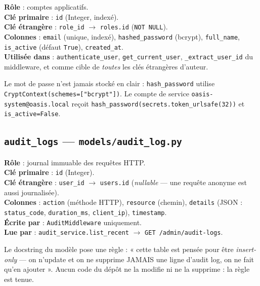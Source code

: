 \documentclass[11pt,a4paper]{report}
\newcommand{\file}[1]{\texttt{\small #1}}
\newcommand{\fn}[1]{\texttt{\small\textcolor{oasisviolet}{#1}}}
\newcommand{\cls}[1]{\texttt{\small\textcolor{oasisblue}{#1}}}
\newcommand{\tbl}[1]{\texttt{\small\textcolor{oasisamber}{#1}}}
\newcommand{\route}[1]{\texttt{\small\textcolor{oasisgreen}{#1}}}
\newcommand{\arrowto}{\ensuremath{\rightarrow}}
\begin{document}
\textbf{Rôle} : comptes applicatifs.\\
\textbf{Clé primaire} : \texttt{id} (Integer, indexé).\\
\textbf{Clé étrangère} : \texttt{role\_id} \arrowto{} \texttt{roles.id}
(\texttt{NOT NULL}).\\
\textbf{Colonnes} : \texttt{email} (unique, indexé), \texttt{hashed\_password}
(bcrypt), \texttt{full\_name}, \texttt{is\_active} (défaut \texttt{True}),
\texttt{created\_at}.\\
\textbf{Utilisée dans} : \fn{authenticate\_user}, \fn{get\_current\_user},
\fn{\_extract\_user\_id} du middleware, et comme cible de \emph{toutes} les clés
étrangères d'auteur.

\begin{infobox}
Le mot de passe n'est jamais stocké en clair : \fn{hash\_password} utilise
\texttt{CryptContext(schemes=["bcrypt"])}. Le compte de service
\texttt{oasis-system@oasis.local} reçoit
\texttt{hash\_password(secrets.token\_urlsafe(32))} et
\texttt{is\_active=False}.
\end{infobox}

\subsection{\tbl{audit\_logs} --- \file{models/audit\_log.py}}

\textbf{Rôle} : journal immuable des requêtes HTTP.\\
\textbf{Clé primaire} : \texttt{id} (Integer).\\
\textbf{Clé étrangère} : \texttt{user\_id} \arrowto{} \texttt{users.id}
(\emph{nullable} --- une requête anonyme est aussi journalisée).\\
\textbf{Colonnes} : \texttt{action} (méthode HTTP), \texttt{resource} (chemin),
\texttt{details} (JSON : \texttt{status\_code}, \texttt{duration\_ms},
\texttt{client\_ip}), \texttt{timestamp}.\\
\textbf{Écrite par} : \cls{AuditMiddleware} uniquement.\\
\textbf{Lue par} : \fn{audit\_service.list\_recent} \arrowto{}
\route{GET /admin/audit-logs}.

\begin{keybox}
Le docstring du modèle pose une règle : « cette table est pensée pour être
\emph{insert-only} --- on n'update et on ne supprime JAMAIS une ligne d'audit
log, on ne fait qu'en ajouter ». Aucun code du dépôt ne la modifie ni ne la
supprime : la règle est tenue.
\end{keybox}
\end{document}
